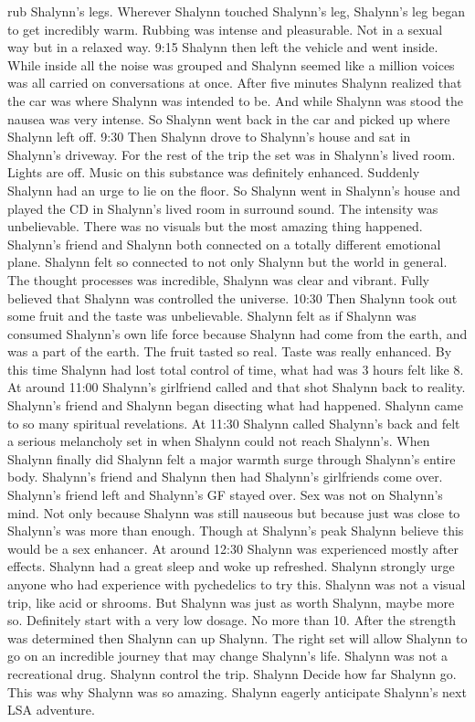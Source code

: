 \documentclass[12pt]{book}
\begin{document}
rub Shalynn's legs. Wherever Shalynn touched Shalynn's leg, Shalynn's leg began to get incredibly warm. Rubbing was intense and pleasurable. Not in a sexual way but in a relaxed way. 9:15 Shalynn then left the vehicle and went inside. While inside all the noise was grouped and Shalynn seemed like a million voices was all carried on conversations at once. After five minutes Shalynn realized that the car was where Shalynn was intended to be. And while Shalynn was stood the nausea was very intense. So Shalynn went back in the car and picked up where Shalynn left off. 9:30 Then Shalynn drove to Shalynn's house and sat in Shalynn's driveway. For the rest of the trip the set was in Shalynn's lived room. Lights are off. Music on this substance was definitely enhanced. Suddenly Shalynn had an urge to lie on the floor. So Shalynn went in Shalynn's house and played the CD in Shalynn's lived room in surround sound. The intensity was unbelievable. There was no visuals but the most amazing thing happened. Shalynn's friend and Shalynn both connected on a totally different emotional plane. Shalynn felt so connected to not only Shalynn but the world in general. The thought processes was incredible, Shalynn was clear and vibrant. Fully believed that Shalynn was controlled the universe. 10:30 Then Shalynn took out some fruit and the taste was unbelievable. Shalynn felt as if Shalynn was consumed Shalynn's own life force because Shalynn had come from the earth, and was a part of the earth. The fruit tasted so real. Taste was really enhanced. By this time Shalynn had lost total control of time, what had was 3 hours felt like 8. At around 11:00 Shalynn's girlfriend called and that shot Shalynn back to reality. Shalynn's friend and Shalynn began disecting what had happened. Shalynn came to so many spiritual revelations. At 11:30 Shalynn called Shalynn's back and felt a serious melancholy set in when Shalynn could not reach Shalynn's. When Shalynn finally did Shalynn felt a major warmth surge through Shalynn's entire body. Shalynn's friend and Shalynn then had Shalynn's girlfriends come over. Shalynn's friend left and Shalynn's GF stayed over. Sex was not on Shalynn's mind. Not only because Shalynn was still nauseous but because just was close to Shalynn's was more than enough. Though at Shalynn's peak Shalynn believe this would be a sex enhancer. At around 12:30 Shalynn was experienced mostly after effects. Shalynn had a great sleep and woke up refreshed. Shalynn strongly urge anyone who had experience with pychedelics to try this. Shalynn was not a visual trip, like acid or shrooms. But Shalynn was just as worth Shalynn, maybe more so. Definitely start with a very low dosage. No more than 10. After the strength was determined then Shalynn can up Shalynn. The right set will allow Shalynn to go on an incredible journey that may change Shalynn's life. Shalynn was not a recreational drug. Shalynn control the trip. Shalynn Decide how far Shalynn go. This was why Shalynn was so amazing. Shalynn eagerly anticipate Shalynn's next LSA adventure.
\end{document}
